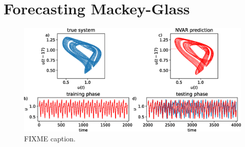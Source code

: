 \section{Forecasting Mackey-Glass}

\begin{figure}
  \includegraphics[width=\textwidth]{figures/nvar-predict-mackey-glass}
  \caption{FIXME caption.}
  \label{fig:nvar-predict-mackey-glass}
\end{figure}
